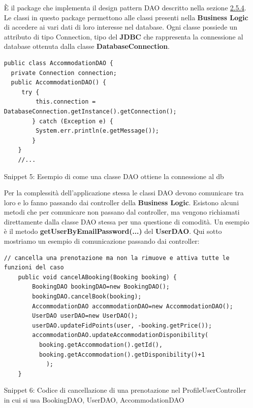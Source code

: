 \documentclass[10pt]{article}
\begin{document}
\`E il package che implementa il design pattern DAO descritto nella sezione \hyperref[daosec]{2.5.4}. Le classi in questo package permettono alle classi presenti nella \textbf{Business Logic} di accedere ai vari dati di loro interesse nel database. Ogni classe possiede un attributo di tipo Connection, tipo del \textbf{JDBC} che rappresenta la connessione al database ottenuta dalla classe \textbf{DatabaseConnection}.
\newline
\begin{lstlisting}
public class AccommodationDAO {
  private Connection connection;
  public AccommodationDAO() {
     try {
         this.connection = DatabaseConnection.getInstance().getConnection();
        } catch (Exception e) {
         System.err.println(e.getMessage());
        }
    }
    //...
\end{lstlisting}
\begin{center}
\par
Snippet 5: Esempio di come una classe DAO ottiene la connessione al db
\par\medskip
\end{center}
Per la complessit\`a dell'applicazione stessa le classi DAO devono comunicare tra loro e lo fanno passando dai controller della \textbf{Business Logic}. Esistono alcuni metodi che per comunicare non passano dal controller, ma vengono richiamati direttamente dalla classe DAO stessa per una questione di comodit\`a. Un esempio è il metodo \textbf{getUserByEmailPassword(...)} del \textbf{UserDAO}.
\newline
Qui sotto mostriamo un esempio di comunicazione passando dai controller:
\begin{lstlisting}
// cancella una prenotazione ma non la rimuove e attiva tutte le funzioni del caso
    public void cancelABooking(Booking booking) {
        BookingDAO bookingDAO=new BookingDAO();
        bookingDAO.cancelBook(booking);
        AccommodationDAO accommodationDAO=new AccommodationDAO();
        UserDAO userDAO=new UserDAO();
        userDAO.updateFidPoints(user, -booking.getPrice());
        accommodationDAO.updateAccommodationDisponibility(
          booking.getAccommodation().getId(),
          booking.getAccommodation().getDisponibility()+1
            );
    }
\end{lstlisting}
\begin{center}
\par
Snippet 6: Codice di cancellazione di una prenotazione nel ProfileUserController in cui si usa BookingDAO, UserDAO, AccommodationDAO
\par\medskip
\end{center}
\end{document}
